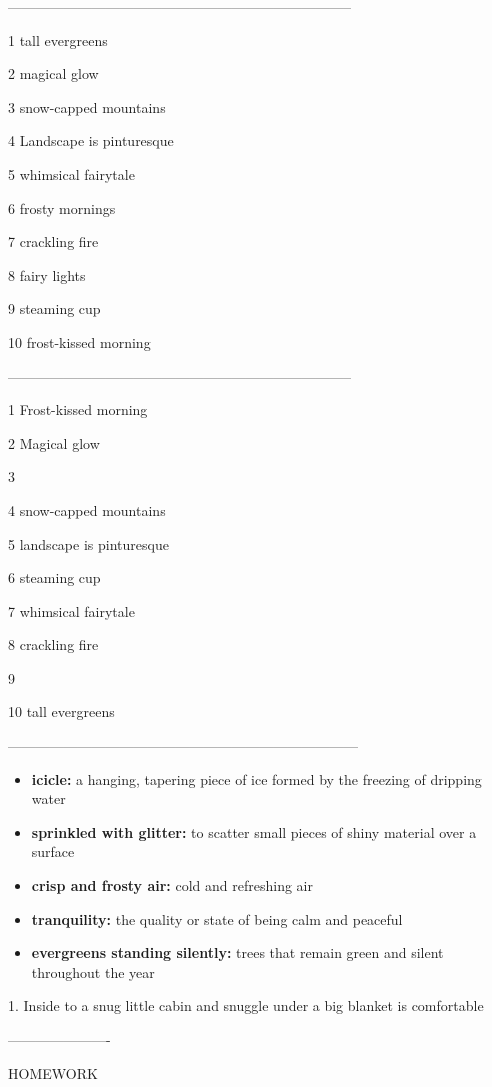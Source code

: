 --------------------------------------------------------------------------


1 tall evergreens

2 magical glow

3 snow-capped mountains

4 Landscape is pinturesque 

5 whimsical fairytale

6 frosty mornings

7 crackling fire

8 fairy lights

9 steaming cup

10 frost-kissed morning


--------------------------------------------------------------------------

1 Frost-kissed morning

2 Magical glow

3 

4 snow-capped mountains

5 landscape is pinturesque

6 steaming cup

7 whimsical fairytale

8 crackling fire

9 

10 tall evergreens

---------------------------------------------------------------------------



\begin{itemize}
    \item \textbf{icicle:} a hanging, tapering piece of ice formed by the freezing of dripping water
    \item \textbf{sprinkled with glitter:} to scatter small pieces of shiny material over a surface
    \item \textbf{crisp and frosty air:} cold and refreshing air
    \item \textbf{tranquility:} the quality or state of being calm and peaceful
    \item \textbf{evergreens standing silently:} trees that remain green and silent throughout the year
\end{itemize}


1.  Inside to a snug little cabin and snuggle under a big blanket is comfortable


----------------------

HOMEWORK


